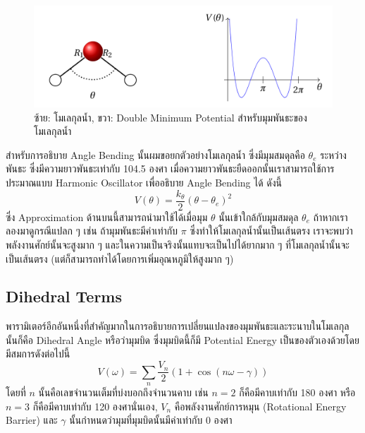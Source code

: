 \begin{figure}[H]
  \centering
  \includegraphics[width=\linewidth]{fig/water-angle-bending.png}
  \caption{ซ้าย: โมเลกุลน้ำ, ขวา: Double Minimum Potential สำหรับมุมพันธะของโมเลกุลน้ำ}
  \label{fig:water_angle_bending}
\end{figure}

สำหรับการอธิบาย Angle Bending นั้นผมขอยกตัวอย่างโมเลกุลน้ำ  ซึ่งมีมุมสมดุลคือ $\theta_{e}$ ระหว่างพันธะ  ซึ่งมีความยาวพันธะเท่ากับ 104.5 องศา เมื่อความยาวพันธะยืดออกนั้นเราสามารถใช้การประมาณแบบ Harmonic Oscillator เพื่ออธิบาย Angle Bending ได้ ดังนี้
%
\begin{equation}
  V(\theta)
  =
  \frac{k_{\theta}}{2}
  (\theta - \theta_{e})^{2}
\end{equation}
%
ซึ่ง Approximation ด้านบนนี้สามารถนำมาใช้ได้เมื่อมุม $\theta$ นั้นเข้าใกล้กับมุมสมดุล $\theta_{e}$
%
ถ้าหากเราลองมาดูกรณีแปลก ๆ เช่น ถ้ามุมพันธะมีค่าเท่ากับ $\pi$ ซึ่งทำให้โมเลกุลน้ำนั้นเป็นเส้นตรง เราจะพบว่าพลังงานศักย์นั้นจะสูงมาก ๆ และในความเป็นจริงนั้นแทบจะเป็นไปได้ยากมาก ๆ ที่โมเลกุลน้ำนั้นจะเป็นเส้นตรง (แต่ก็สามารถทำได้โดยการเพิ่มอุณหภูมิให้สูงมาก ๆ)

\subsection{Dihedral Terms}

พารามิเตอร์อีกอันหนึ่งที่สำคัญมากในการอธิบายการเปลี่ยนแปลงของมุมพันธะและระนาบในโมเลกุลนั้นก็คือ Dihedral Angle หรือว่ามุมบิด ซึ่งมุมบิดนี้ก็มี Potential Energy เป็นของตัวเองด้วยโดยมีสมการดังต่อไปนี้
%
\begin{equation}
  V(\omega)
  =
  \sum_{n} \frac{V_{n}}{2}
  \left(
  1 + \cos(n\omega - \gamma)
  \right)
\end{equation}
%
โดยที่ $n$ นั้นคือเลขจำนวนเต็มที่บ่งบอกถึงจำนวนคาบ เช่น $n = 2$ ก็คือมีคาบเท่ากับ 180 องศา หรือ $n = 3$ ก็คือมีคาบเท่ากับ 120 องศานั่นเอง, $V_{n}$ คือพลังงานศักย์การหมุน (Rotational Energy Barrier) และ $\gamma$ นั้นกำหนดว่ามุมที่มุมบิดนั้นมีค่าเท่ากับ 0 องศา

